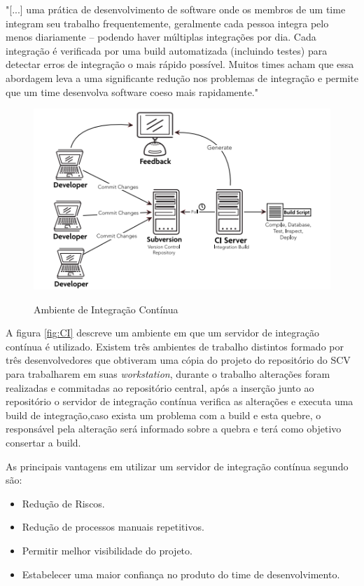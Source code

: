 \begin{citacao}
"[...] uma prática de desenvolvimento de software onde os membros de um time integram seu trabalho frequentemente, geralmente cada pessoa integra pelo menos diariamente – podendo haver múltiplas integrações por dia. Cada integração é verificada por uma build automatizada (incluindo testes) para detectar erros de integração o mais rápido possível. Muitos times acham que essa abordagem leva a uma significante redução nos problemas de integração e permite que um time desenvolva software coeso mais rapidamente." 
\end{citacao}

\begin{figure}[tbh]
\centering
\caption[Ambiente de Integração Contínua]{Ambiente de Integração Contínua}
\includegraphics[width=0.7\linewidth]{./images/CI}
\label{fig:CI}
\end{figure}

A figura \autoref{fig:CI} descreve um ambiente em que um servidor de integração contínua é utilizado. Existem três ambientes de trabalho distintos formado por três desenvolvedores que obtiveram uma cópia do projeto do repositório do SCV para trabalharem em suas \textit{workstation}, durante o trabalho alterações foram realizadas e commitadas ao repositório central, após a inserção junto ao repositório o servidor de integração contínua verifica as alterações e executa uma build de integração,caso exista um problema com a build e esta quebre, o responsável pela alteração será informado sobre a quebra e terá como objetivo consertar a build.

As principais vantagens em utilizar um servidor de integração contínua segundo  são:

\begin{itemize}
\item Redução de Riscos.
\item Redução de processos manuais repetitivos.
\item Permitir melhor visibilidade do projeto.
\item Estabelecer uma maior confiança no produto do time de desenvolvimento.
\end{itemize}

